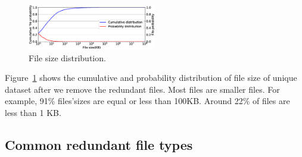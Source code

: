 \begin{figure}
	\centering
	\includegraphics[width=0.5\textwidth]{graphs/File_size-KB.eps}
	\caption{File size distribution.
	}
	\label{fig:file-size}
\end{figure}

Figure~\ref{fig:file-size} shows the cumulative and probability distribution of file size of unique dataset after we remove the redundant files.
Most files are smaller files. For example, 91\% files'sizes are equal or less than 100KB. 
Around 22\% of files are less than 1 KB.
 

\subsection{Common redundant file types}



